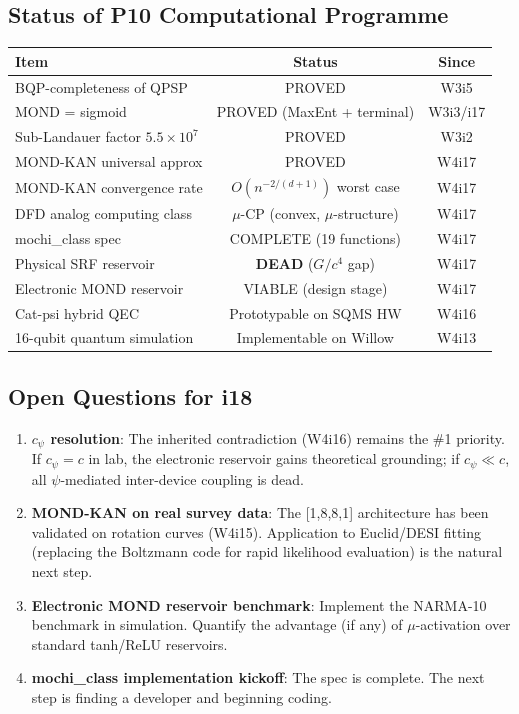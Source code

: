 \documentclass[11pt]{article}
\theoremstyle{definition}
\theoremstyle{remark}
\newcommand{\ee}[1]{\times 10^{#1}}
\begin{document}
\subsection{Status of P10 Computational Programme}

\begin{center}
\begin{tabular}{p{4cm}cc}
\toprule
\textbf{Item} & \textbf{Status} & \textbf{Since} \\
\midrule
BQP-completeness of QPSP & PROVED & W3i5 \\
MOND = sigmoid & PROVED (MaxEnt + terminal) & W3i3/i17 \\
Sub-Landauer factor $5.5 \ee{7}$ & PROVED & W3i2 \\
MOND-KAN universal approx & PROVED & W4i17 \\
MOND-KAN convergence rate & $O(n^{-2/(d+1)})$ worst case & W4i17 \\
DFD analog computing class & $\mu$-CP (convex, $\mu$-structure) & W4i17 \\
mochi\_class spec & COMPLETE (19 functions) & W4i17 \\
Physical SRF reservoir & \textbf{DEAD} ($G/c^4$ gap) & W4i17 \\
Electronic MOND reservoir & VIABLE (design stage) & W4i17 \\
Cat-psi hybrid QEC & Prototypable on SQMS HW & W4i16 \\
16-qubit quantum simulation & Implementable on Willow & W4i13 \\
\bottomrule
\end{tabular}
\end{center}

\subsection{Open Questions for i18}

\begin{enumerate}
\item \textbf{$c_\psi$ resolution}: The inherited contradiction
  (W4i16) remains the \#1 priority. If $c_\psi = c$ in lab, the
  electronic reservoir gains theoretical grounding; if $c_\psi \ll c$,
  all $\psi$-mediated inter-device coupling is dead.

\item \textbf{MOND-KAN on real survey data}: The [1,8,8,1] architecture
  has been validated on rotation curves (W4i15). Application to
  Euclid/DESI fitting (replacing the Boltzmann code for rapid
  likelihood evaluation) is the natural next step.

\item \textbf{Electronic MOND reservoir benchmark}: Implement the
  NARMA-10 benchmark in simulation. Quantify the advantage (if any)
  of $\mu$-activation over standard tanh/ReLU reservoirs.

\item \textbf{mochi\_class implementation kickoff}: The spec is
  complete. The next step is finding a developer and beginning
  coding.
\end{enumerate}
\end{document}
